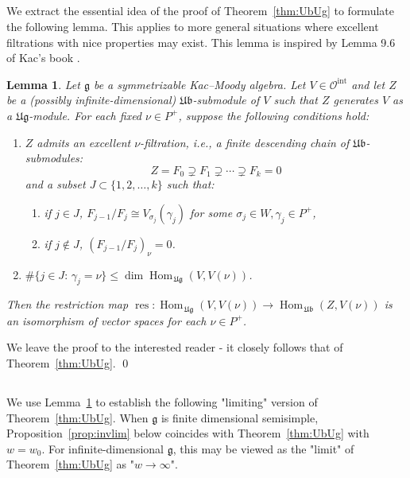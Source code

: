 \documentclass[12pt,reqno]{amsart}
\theoremstyle{plain}
\newtheorem{lemma}[theorem]{Lemma}
\theoremstyle{definition}
\theoremstyle{remark}
\theoremstyle{plain}
\newcommand{\catoint}{\mathcal{O}^{\mathrm{int}}}
\newcommand{\lie}{\mathfrak}
\DeclareMathOperator{\res}{res}
\DeclareMathOperator{\Hom}{Hom}
\begin{document}
\subsection{}
We extract the essential idea of the proof of Theorem~\ref{thm:UbUg} to formulate the following lemma. This applies to more general situations where excellent filtrations with nice properties may exist. This lemma is inspired by Lemma 9.6 of Kac's book \cite{Kac}.
\begin{lemma}\label{lem:UbUg-seed}
    Let $\mathfrak{g}$ be a symmetrizable Kac--Moody algebra. Let $V \in \catoint$ and let $Z$ be a (possibly infinite-dimensional) $\lie{Ub}$-submodule of $V$ such that $Z$ generates $V$ as a $\lie{Ug}$-module. For each fixed $\nu \in P^+$, suppose the following conditions hold:
    \begin{enumerate}
        \item $Z$ admits an {\em excellent} $\nu$-{\em filtration}, i.e.,  
    a finite descending chain of $\mathfrak{Ub}$-submodules:
    $$ Z = F_0\supsetneq F_1\supsetneq \cdots  \supsetneq  F_k =0$$ 
    and a subset $J \subset \{1, 2, \ldots, k\}$ such that: 
    \begin{enumerate}
        \item if $j \in J$, $F_{j-1}/F_{j}\cong V_{\sigma_j}(\gamma_j)$ for some $\sigma_j\in W, \gamma_j\in P^+$, 
        \item if $j \notin J$, $\left(F_{j-1}/F_{j}\right)_\nu =0$. 
    \end{enumerate}
    \item  $\#\{j \in J:\, \gamma_j=\nu\} \leq \dim \Hom_{\,\mathfrak{Ug}} (V, V(\nu))$.
        \end{enumerate} 
    Then the restriction map
     $\res:  \Hom_{\,\mathfrak{Ug}} (V, V(\nu)) \to \Hom_{\,\mathfrak{Ub}} (Z, V(\nu))$ is an isomorphism of vector spaces for each $\nu \in P^+$.
\end{lemma}
 We leave the proof to the interested reader - it closely follows that of Theorem~\ref{thm:UbUg}. \qed
 
\subsection{}
We use Lemma~\ref{lem:UbUg-seed} to establish the following "limiting" version of Theorem~\ref{thm:UbUg}. When $\lie g$ is finite dimensional semisimple, Proposition~\ref{prop:invlim} below coincides with Theorem~\ref{thm:UbUg} with $w=w_0$. For  infinite-dimensional $\lie g$, this may be viewed as the "limit" of Theorem~\ref{thm:UbUg} as "$w \to \infty$".
\end{document}
